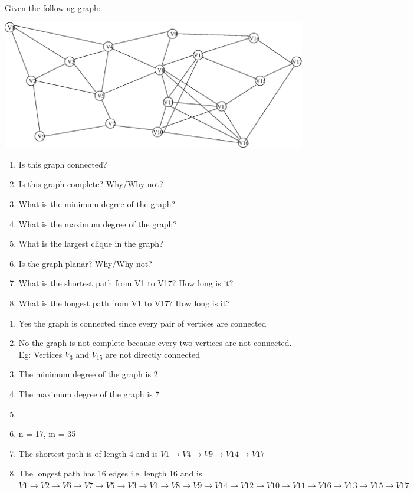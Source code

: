 \documentclass[10pt]{article}
\newenvironment{solution}[2][Solution]{ \begin{trivlist}
\item[\hskip \labelsep {\bfseries #1}]}{\end{trivlist}}
\newenvironment{problem}[2][Problem]{\begin{trivlist}
\item[\hskip \labelsep {\bfseries #1}\hskip \labelsep {\bfseries #2.}]}{\end{trivlist}}
\begin{document}
\begin{problem}{4} Given the following graph:

\begin{center}
\includegraphics[scale=0.7]{graph.eps}
\end{center}
\begin{enumerate}
    \parskip=0in
    \parsep=0in
    \itemsep=0.1in
    \item Is this graph connected?
    \item Is this graph complete?  Why/Why not?
    \item What is the minimum degree of the graph?
    \item What is the maximum degree of the graph?
    \item What is the largest clique in the graph?
    \item Is the graph planar? Why/Why not?
    \item What is the shortest path from V1 to V17? How long is it?
    \item What is the longest path from V1 to V17?  How long is it?
\end{enumerate}
\end{problem}
\begin{solution}{4}
\item[]
\begin{enumerate}
    \parskip=0in
    \parsep=0in
    \itemsep=0.1in
    \item Yes the graph is connected since every pair of vertices are connected
    \item No the graph is not complete because every two vertices are not connected. Eg: Vertices $V_3$ and $V_15$ are not directly connected
    \item The minimum degree of the graph is 2
    \item The maximum degree of the graph is 7
    \item
    \item n = 17, m = 35 
    \item The shortest path is of length 4 and is $V1 \rightarrow V4 \rightarrow V9 \rightarrow V{14}
    \rightarrow V{17}$
    \item The longest path has 16 edges i.e. length 16 and is $V1\rightarrow V2\rightarrow V6\rightarrow V7\rightarrow V5\rightarrow V3\rightarrow V4\rightarrow V8\rightarrow V9\rightarrow V14\rightarrow V12\rightarrow V10\rightarrow V11\rightarrow V16\rightarrow V13\rightarrow V15\rightarrow V17$
\end{enumerate}
\end{solution}
\end{document}
